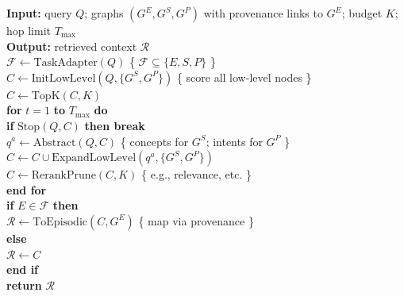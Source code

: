 \begin{table}[t]
\centering
\caption{Multi-hop retrieval control flow (pseudo-code style).}
\label{lst:apdx_multi_hop_retrieval_pseudo_code}

\begin{tcolorbox}[colback=white,colframe=black!30,boxrule=0.6pt,left=6pt,right=6pt,top=4pt,bottom=4pt,
width=0.8\linewidth]
\ttfamily
\textbf{Input:} query $Q$; graphs $(G^{E},G^{S},G^{P})$ with provenance links to $G^{E}$; budget $K$; hop limit $T_{\max}$\\
\textbf{Output:} retrieved context $\mathcal{R}$\\[2pt]

$\mathcal{F} \leftarrow \mathrm{TaskAdapter}(Q)$ \hfill \{ $\mathcal{F}\subseteq\{E,S,P\}$ \}\\
$C \leftarrow \mathrm{InitLowLevel}(Q,\{G^{S},G^{P}\})$ \hfill \{ score all low-level nodes \}\\
$C \leftarrow \mathrm{TopK}(C,K)$\\[2pt]

\textbf{for} $t=1$ \textbf{to} $T_{\max}$ \textbf{do}\\
\hspace*{1.5em}\textbf{if} $\mathrm{Stop}(Q,C)$ \textbf{then break}\\
\hspace*{1.5em}$q^{a} \leftarrow \mathrm{Abstract}(Q,C)$ \hfill \{ concepts for $G^{S}$; intents for $G^{P}$ \}\\
\hspace*{1.5em}$C \leftarrow C \cup \mathrm{ExpandLowLevel}(q^{a},\{G^{S},G^{P}\})$\\
\hspace*{1.5em}$C \leftarrow \mathrm{RerankPrune}(C,K)$ \hfill \{ e.g., relevance, etc. \}\\
\textbf{end for}\\[2pt]

\textbf{if} $E \in \mathcal{F}$ \textbf{then}\\
\hspace*{1.5em}$\mathcal{R} \leftarrow \mathrm{ToEpisodic}(C,G^{E})$ \hfill \{ map via provenance \}\\
\textbf{else}\\
\hspace*{1.5em}$\mathcal{R} \leftarrow C$\\
\textbf{end if}\\
\textbf{return} $\mathcal{R}$
\end{tcolorbox}

\end{table}